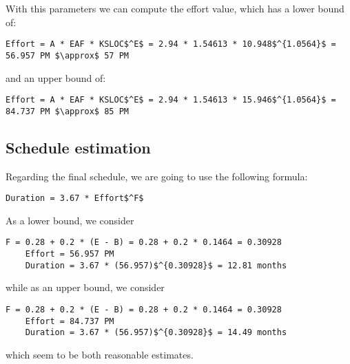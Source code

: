 With this parameters we can compute the effort value, which has a lower bound of:
\begin{lstlisting}[mathescape, numbers=none]
	Effort = A * EAF * KSLOC$^E$ = 2.94 * 1.54613 * 10.948$^{1.0564}$ = 56.957 PM $\approx$ 57 PM
\end{lstlisting}
and an upper bound of:
\begin{lstlisting}[mathescape, numbers=none]
	Effort = A * EAF * KSLOC$^E$ = 2.94 * 1.54613 * 15.946$^{1.0564}$ = 84.737 PM $\approx$ 85 PM
\end{lstlisting}

\subsection{Schedule estimation}
Regarding the final schedule, we are going to use the following formula:
\begin{lstlisting}[mathescape, numbers=none]
	Duration = 3.67 * Effort$^F$
\end{lstlisting}
As a lower bound, we consider
\begin{lstlisting}[mathescape, numbers=none]
	F = 0.28 + 0.2 * (E - B) = 0.28 + 0.2 * 0.1464 = 0.30928
	Effort = 56.957 PM 
	Duration = 3.67 * (56.957)$^{0.30928}$ = 12.81 months
\end{lstlisting}
while as an upper bound, we consider
\begin{lstlisting}[mathescape, numbers=none]
	F = 0.28 + 0.2 * (E - B) = 0.28 + 0.2 * 0.1464 = 0.30928
	Effort = 84.737 PM 
	Duration = 3.67 * (56.957)$^{0.30928}$ = 14.49 months
\end{lstlisting}
which seem to be both reasonable estimates. 